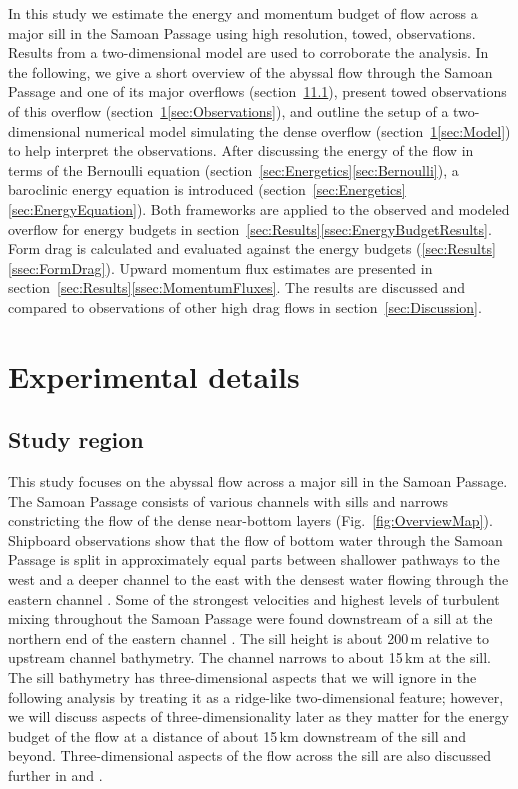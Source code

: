 \documentclass{ametsocV6.1}
\begin{document}
In this study we estimate the energy and momentum budget of flow across a major sill in the Samoan Passage using high resolution, towed, observations.
Results from a two-dimensional model are used to corroborate the analysis.
In the following, we give a short overview of the abyssal flow through the Samoan Passage and one of its major overflows (section~\ref{sec:ExperimentalDetails}\ref{sec:StudyRegion}), present towed observations of this overflow (section~\ref{sec:ExperimentalDetails}\ref{sec:Observations}),  and outline the setup of a two-dimensional numerical model simulating the dense overflow (section~\ref{sec:ExperimentalDetails}\ref{sec:Model}) to help interpret the observations.
After discussing the energy of the flow in terms of the Bernoulli equation (section~\ref{sec:Energetics}\ref{sec:Bernoulli}), a baroclinic energy equation is introduced (section~\ref{sec:Energetics}\ref{sec:EnergyEquation}).
Both frameworks are applied to the observed and modeled overflow for energy budgets in section~\ref{sec:Results}\ref{ssec:EnergyBudgetResults}.
Form drag is calculated and evaluated against the energy budgets (\ref{sec:Results}\ref{ssec:FormDrag}).
Upward momentum flux estimates are presented in section~\ref{sec:Results}\ref{ssec:MomentumFluxes}.
The results are discussed and compared to observations of other high drag flows in section~\ref{sec:Discussion}.

\section{Experimental details}\label{sec:ExperimentalDetails}

\subsection{Study region}\label{sec:StudyRegion}
This study focuses on the abyssal flow across a major sill in the Samoan Passage.
The Samoan Passage consists of various channels with sills and narrows constricting the flow of the dense near-bottom layers (Fig.~\ref{fig:OverviewMap}).
Shipboard observations show that the flow of bottom water through the Samoan Passage is split in approximately equal parts between shallower pathways to the west and a deeper channel to the east with the densest water flowing through the eastern channel \citep{voetetal15}.
Some of the strongest velocities and highest levels of turbulent mixing throughout the Samoan Passage were found downstream of a sill at the northern end of the eastern channel \citep{alfordetal13c}.
The sill height is about 200\,m relative to upstream channel bathymetry.
The channel narrows to about 15\,km at the sill.
The sill bathymetry has three-dimensional aspects that we will ignore in the following analysis by treating it as a ridge-like two-dimensional feature; however, we will discuss aspects of three-dimensionality later as they matter for the energy budget of the flow at a distance of about 15\,km downstream of the sill and beyond.
Three-dimensional aspects of the flow across the sill are also discussed further in \citet{girtonetal19} and \citet{cusacketal21}.
\end{document}

